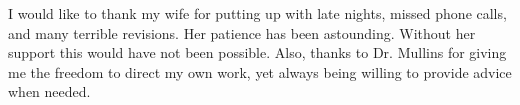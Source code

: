 \par I would like to thank my wife for putting up with late nights, missed phone calls, and many terrible revisions. Her patience has been astounding. Without her support this would have not been possible. Also, thanks to Dr. Mullins for giving me the freedom to direct my own work, yet always being willing to provide advice when needed.


